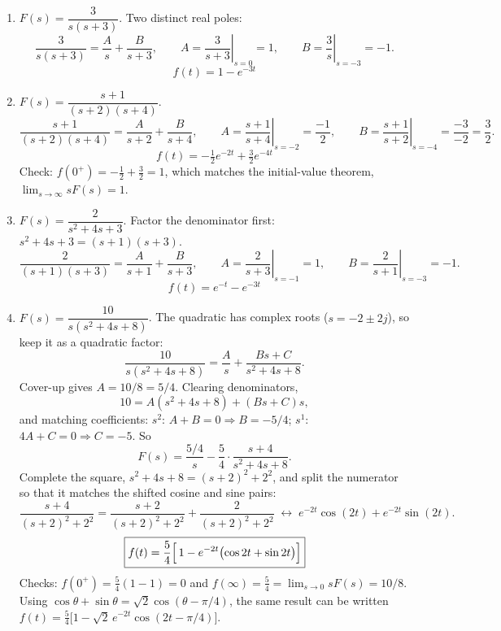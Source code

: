 \documentclass[11pt]{article}
\begin{document}
\begin{enumerate}[resume]

\item $F(s) = \dfrac{3}{s(s+3)}$.  Two distinct real poles:
\[
  \frac{3}{s(s+3)} = \frac{A}{s} + \frac{B}{s+3},
  \qquad
  A = \left.\frac{3}{s+3}\right|_{s=0} = 1,
  \qquad
  B = \left.\frac{3}{s}\right|_{s=-3} = -1.
\]
\[
  \boxed{f(t) = 1 - e^{-3t}}
\]

\item $F(s) = \dfrac{s+1}{(s+2)(s+4)}$.
\[
  \frac{s+1}{(s+2)(s+4)} = \frac{A}{s+2} + \frac{B}{s+4},
  \qquad
  A = \left.\frac{s+1}{s+4}\right|_{s=-2} = \frac{-1}{2},
  \qquad
  B = \left.\frac{s+1}{s+2}\right|_{s=-4} = \frac{-3}{-2} = \frac{3}{2}.
\]
\[
  \boxed{f(t) = -\tfrac{1}{2}e^{-2t} + \tfrac{3}{2}e^{-4t}}
\]
Check: $f(0^+) = -\tfrac12 + \tfrac32 = 1$, which matches the initial-value
theorem, $\lim_{s\to\infty} sF(s) = 1$.

\item $F(s) = \dfrac{2}{s^2 + 4s + 3}$.  Factor the denominator first:
$s^2 + 4s + 3 = (s+1)(s+3)$.
\[
  \frac{2}{(s+1)(s+3)} = \frac{A}{s+1} + \frac{B}{s+3},
  \qquad
  A = \left.\frac{2}{s+3}\right|_{s=-1} = 1,
  \qquad
  B = \left.\frac{2}{s+1}\right|_{s=-3} = -1.
\]
\[
  \boxed{f(t) = e^{-t} - e^{-3t}}
\]

\item $F(s) = \dfrac{10}{s(s^2 + 4s + 8)}$.  The quadratic has complex
roots ($s = -2 \pm 2j$), so keep it as a quadratic factor:
\[
  \frac{10}{s(s^2+4s+8)} = \frac{A}{s} + \frac{Bs + C}{s^2+4s+8}.
\]
Cover-up gives $A = 10/8 = 5/4$.  Clearing denominators,
\[
  10 = A(s^2 + 4s + 8) + (Bs + C)s,
\]
and matching coefficients: $s^2$: $A + B = 0 \Rightarrow B = -5/4$;
$s^1$: $4A + C = 0 \Rightarrow C = -5$.  So
\[
  F(s) = \frac{5/4}{s} - \frac{5}{4}\cdot\frac{s+4}{s^2+4s+8}.
\]
Complete the square, $s^2 + 4s + 8 = (s+2)^2 + 2^2$, and split the numerator
so that it matches the shifted cosine and sine pairs:
\[
  \frac{s+4}{(s+2)^2 + 2^2}
  = \frac{s+2}{(s+2)^2 + 2^2} + \frac{2}{(s+2)^2 + 2^2}
  \;\leftrightarrow\;
  e^{-2t}\cos(2t) + e^{-2t}\sin(2t).
\]
\[
  \boxed{f(t) = \frac{5}{4}\Bigl[\,1 - e^{-2t}\bigl(\cos 2t + \sin 2t\bigr)\Bigr]}
\]
Checks: $f(0^+) = \tfrac54(1 - 1) = 0$ and
$f(\infty) = \tfrac54 = \lim_{s\to 0} sF(s) = 10/8$.
Using $\cos\theta + \sin\theta = \sqrt{2}\cos(\theta - \pi/4)$, the same
result can be written $f(t) = \tfrac54\bigl[1 - \sqrt{2}\,e^{-2t}\cos(2t - \pi/4)\bigr]$.

\end{enumerate}
\end{document}
